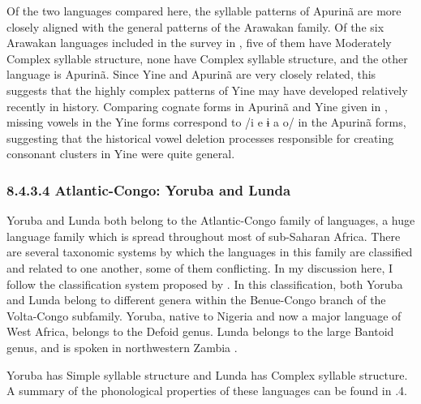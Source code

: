   Of the two languages compared here, the syllable patterns of Apurinã are more closely aligned with the general patterns of the Arawakan family. Of the six Arawakan languages included in the survey in \citet{Maddieson2013a}, five of them have Moderately Complex syllable structure, none have Complex syllable structure, and the other language is Apurinã. Since Yine and Apurinã are very closely related, this suggests that the highly complex patterns of Yine may have developed relatively recently in history. Comparing cognate forms in Apurinã and Yine given in \citet[88-9]{Facundes2002}, missing vowels in the Yine forms correspond to /i e ɨ a o/ in the Apurinã forms, suggesting that the historical vowel deletion processes responsible for creating consonant clusters in Yine were quite general.


\subsubsection{\textbf{8.4.3.4} \textbf{Atlantic-Congo:} \textbf{Yoruba} \textbf{and} \textbf{Lunda}}

  Yoruba and Lunda both belong to the Atlantic-Congo family of languages, a huge language family which is spread throughout most of sub-Saharan Africa. There are several taxonomic systems by which the languages in this family are classified and related to one another, some of them conflicting. In my discussion here, I follow the classification system proposed by \citet{Williamson1989}. In this classification, both Yoruba and Lunda belong to different genera within the Benue-Congo branch of the Volta-Congo subfamily. Yoruba, native to Nigeria and now a major language of West Africa, belongs to the Defoid genus. Lunda belongs to the large Bantoid genus, and is spoken in northwestern Zambia \citep{Kawasha2003}.



  Yoruba has Simple syllable structure and Lunda has Complex syllable structure. A summary of the phonological properties of these languages can be found in .4.






